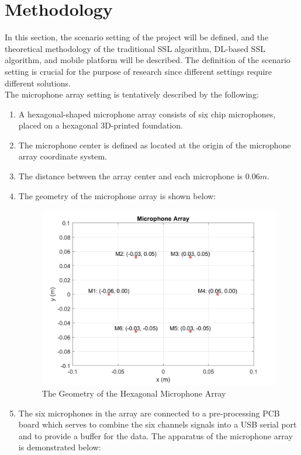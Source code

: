 \chapter*{Methodology}

In this section, the scenario setting of the project will be defined, and the theoretical methodology of the traditional SSL algorithm, DL-based SSL algorithm, and mobile platform will be described. The definition of the scenario setting is crucial for the purpose of research since different settings require different solutions. \\


The microphone array setting is tentatively described by the following:
\begin{enumerate}
    \item A hexagonal-shaped microphone array consists of six chip microphones, placed on a hexagonal 3D-printed foundation.
    \item The microphone center is defined as located at the origin of the microphone array coordinate system.
    \item The distance between the array center and each microphone is \(0.06m\).
    \item The geometry of the microphone array is shown below:
    \begin{figure}[H]
        \centering
        \includegraphics[width=0.8\linewidth]{figures/Geometry_microphone_array.jpg}
        \caption{The Geometry of the Hexagonal Microphone Array}
    \end{figure}
    \item The six microphones in the array are connected to a pre-processing PCB board which serves to combine the six channels signals into a USB serial port and to provide a buffer for the data. The apparatus of the microphone array is demonstrated below: 

\end{enumerate}
